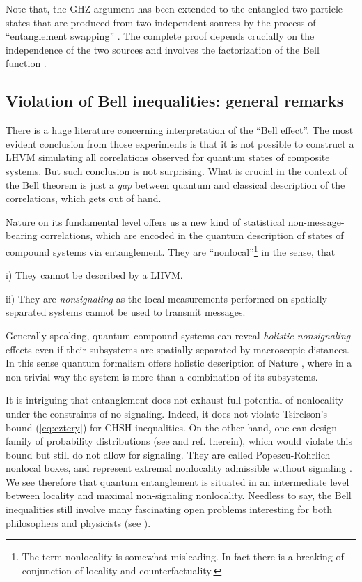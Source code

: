 \documentclass[twocolumn,aps,rmp]{revtex4}
\begin{document}
Note that, the GHZ argument has been extended to the entangled
two-particle states that are produced from two independent sources
\cite {YurkeStoller_ent_swapping} by the process of ``entanglement
swapping'' \cite {ent_swapping}. The complete proof depends crucially
on the independence of the two sources and involves the factorization
of the Bell function \cite {GHZ1}.



\subsection {Violation of Bell inequalities: general remarks}

There is a huge literature concerning interpretation of the ``Bell
effect''. The most evident conclusion from those experiments is that
it is not possible to construct a LHVM simulating all correlations
observed for quantum states of composite systems. But such conclusion
is not surprising. What is crucial in the context of the Bell theorem
is just a {\it gap} between quantum and classical description of the
correlations, which gets out of hand.

Nature on its fundamental level offers us a new kind of statistical
non-message-bearing correlations, which are encoded in the quantum
description of states of compound systems via entanglement. They are
``nonlocal''\footnote {The term nonlocality is somewhat misleading.
  In fact there is a breaking of conjunction of locality and
  counterfactuality.} in the sense, that

i) They cannot be described by a LHVM.

ii) They are {\it nonsignaling} as the local measurements performed
on spatially separated systems cannot be used to transmit messages.

Generally speaking, quantum compound systems can reveal {\it holistic
  nonsignaling} effects even if their subsystems are spatially
separated by macroscopic distances. In this sense quantum formalism
offers holistic description of Nature \cite {Primas}, where in a
non-trivial way the system is more than a combination of its
subsystems.

It is intriguing that entanglement does not exhaust full potential of
nonlocality under the constraints of no-signaling. Indeed, it does not
violate Tsirelson's bound (\ref{eq:cztery}) for CHSH inequalities. On
the other hand, one can design family of probability distributions
(see \cite {NG} and ref. therein), which would violate this bound but
still do not allow for signaling. They are called Popescu-Rohrlich
nonlocal boxes, and represent extremal nonlocality admissible without
signaling \cite{PR}. We see therefore that quantum entanglement is
situated in an intermediate level between locality and maximal
non-signaling nonlocality. Needless to say, the Bell inequalities
still involve many fascinating open problems interesting for both
philosophers and physicists (see \cite{Gisin_philo2007}).
\end{document}
